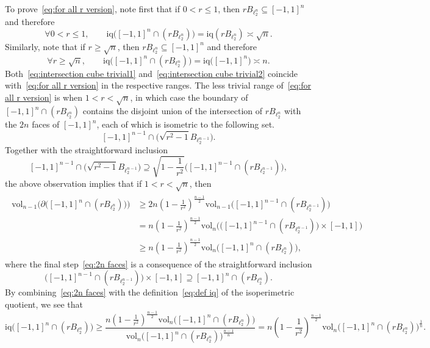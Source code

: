 \documentclass[11pt,reqno]{amsart}
\renewcommand{\le}{\leqslant}
\renewcommand{\ge}{\geqslant}
\theoremstyle{remark}
\newcommand{\iq}{\mathrm{iq}}
\renewcommand{\subset}{\subseteq}
\newcommand{\vol}{\mathrm{vol}}
\renewcommand{\1}{\mathbf 1}
\begin{document}
To prove~\eqref{eq:for all r version}, note first that if $0<r\le 1$, then $rB_{\ell_2^n}\subset [-1,1]^n$ and therefore
\begin{equation}\label{eq:intersection cube trivial1}
\forall 0<r\le 1,\qquad
\iq\big([-1,1]^n\cap (rB_{\ell_2^n})\big)=\iq(rB_{\ell_2^n})\asymp \sqrt{n}.
\end{equation}
Similarly, note that if $r\ge \sqrt{n}$, then $rB_{\ell_2^n}\subset [-1,1]^n$ and therefore
\begin{equation}\label{eq:intersection cube trivial2}
\forall r\ge \sqrt{n},\qquad \iq\big([-1,1]^n\cap (rB_{\ell_2^n})\big)=\iq\big([-1,1]^n\big)\asymp n.
\end{equation}
Both~\eqref{eq:intersection cube trivial1} and~\eqref{eq:intersection cube trivial2}  coincide with~\eqref{eq:for all r version} in the respective ranges. The less trivial range of~\eqref{eq:for all r version} is when $1< r< \sqrt{n}$, in which case the boundary of $[-1,1]^n\cap (rB_{\ell_2^n})$ contains the disjoint union of the intersection of $rB_{\ell_2^n}$ with the $2n$ faces of $[-1,1]^n$, each of which is isometric to the following set.
$$
[-1,1]^{n-1}\cap \big(\sqrt{r^2-1}B_{\ell_2^{n-1}}\big).
$$
Together with the straightforward inclusion
$$
[-1,1]^{n-1}\cap \big(\sqrt{r^2-1}B_{\ell_2^{n-1}}\big)\supseteq \sqrt{1-\frac{1}{r^2}} \big([-1,1]^{n-1}\cap (rB_{\ell_2^{n-1}})\big),
$$
the above observation implies that if $1< r< \sqrt{n}$, then
\begin{align}\label{eq:2n faces}
\begin{split}
\vol_{n-1} \Big(\partial \big([-1,1]^n\cap (rB_{\ell_2^n})\big)\Big)&\ge 2n\left(1-\frac{1}{r^2}\right)^{\frac{n-1}{2}} \vol_{n-1}\big( [-1,1]^{n-1}\cap (rB_{\ell_2^{n-1}})\big)\\&= n\left(1-\frac{1}{r^2}\right)^{\frac{n-1}{2}} \vol_{n}\Big( \big([-1,1]^{n-1}\cap (rB_{\ell_2^{n-1}})\big)\times [-1,1]\Big)\\&\ge n\left(1-\frac{1}{r^2}\right)^{\frac{n-1}{2}} \vol_n \big([-1,1]^n\cap (rB_{\ell_2^n})\big),
\end{split}
\end{align}
where the final step~\eqref{eq:2n faces} is a consequence of the straightforward inclusion
$$
\big([-1,1]^{n-1}\cap (rB_{\ell_2^{n-1}})\big)\times [-1,1]\supseteq [-1,1]^n\cap (rB_{\ell_2^n}).
$$
By combining~\eqref{eq:2n faces} with the definition~\eqref{eq:def iq} of the isoperimetric quotient, we see that
\begin{equation}\label{eq:cancel iq}
\iq\big([-1,1]^n\cap (rB_{\ell_2^n})\big)\ge\frac{n\left(1-\frac{1}{r^2}\right)^{\frac{n-1}{2}} \vol_n \big([-1,1]^n\cap (rB_{\ell_2^n})\big)}{\vol_n\big([-1,1]^n\cap (rB_{\ell_2^n})\big)^{\frac{n-1}{n}}}=n\left(1-\frac{1}{r^2}\right)^{\frac{n-1}{2}} \vol_n \big([-1,1]^n\cap (rB_{\ell_2^n})\big)^{\frac{1}{n}}.
\end{equation}
\end{document}

